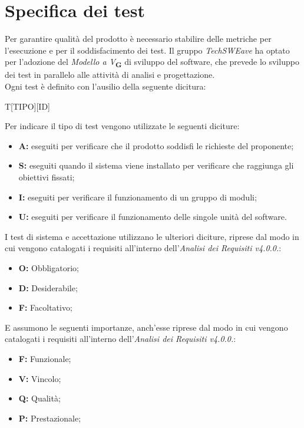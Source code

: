 \section{Specifica dei test}
Per garantire qualità del prodotto è necessario stabilire delle metriche per l’esecuzione e per il soddisfacimento dei test.
Il gruppo \textit{TechSWEave} ha optato per l'adozione del \textit{Modello a V}\textsubscript{\textbf{G}} di sviluppo del software, che
prevede lo sviluppo dei test in parallelo alle attività di analisi e progettazione.\\
Ogni test è definito con l'ausilio della seguente dicitura:\\
\begin{center}
    T[TIPO][ID]
\end{center}
Per indicare il tipo di test vengono utilizzate le seguenti diciture:
\begin{itemize}
    \item \textbf{A:} eseguiti per verificare che il prodotto soddisfi le richieste del proponente;
    \item \textbf{S:} eseguiti quando il sistema viene installato per verificare che raggiunga gli obiettivi fissati;
    \item \textbf{I:} eseguiti per verificare il funzionamento di un gruppo di moduli;
    \item \textbf{U:} eseguiti per verificare il funzionamento delle singole unità del software.
\end{itemize}
I test di sistema e accettazione utilizzano le ulteriori diciture, riprese dal modo in cui vengono catalogati i requisiti all'interno dell'\textit{Analisi dei Requisiti v4.0.0.}:
\begin{itemize}
    \item \textbf{O:} Obbligatorio;
    \item \textbf{D:} Desiderabile;
    \item \textbf{F:} Facoltativo;
\end{itemize}
E assumono le seguenti importanze, anch'esse riprese dal modo in cui vengono catalogati i requisiti all'interno dell'\textit{Analisi dei Requisiti v4.0.0.}:
\begin{itemize}
    \item \textbf{F:} Funzionale;
    \item \textbf{V:} Vincolo;
    \item \textbf{Q:} Qualità;
    \item \textbf{P:} Prestazionale;
\end{itemize}
